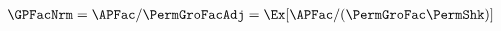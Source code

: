   \begin{align}
    \GPFacNrm  & = \APFac/\PermGroFacAdj = \Ex[\APFac/(\PermGroFac\PermShk)]  \label{eq:GPFacNrmDefn}
  \end{align}
